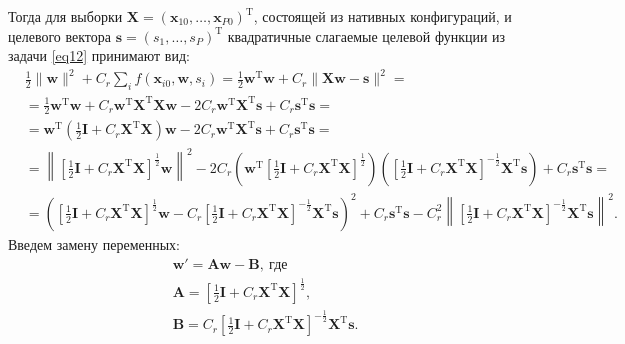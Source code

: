 \documentclass[12pt,twoside]{article}
\begin{document}
Тогда для выборки ${\mathbf{X}}=({\mathbf{x}}_{10}, \dots, {\mathbf{x}}_{P0})^{\text{T}}$, состоящей из нативных конфигураций, и целевого вектора  $\mathbf{s}=(s_1,\dots,s_P)^{\text{T}}$ квадратичные слагаемые целевой функции из задачи \eqref{eq12} принимают вид:
\begin{equation*}
\begin{aligned}
& \frac{1}{2} \|{\mathbf{w}}\|^2 + C_{r}\sum\limits_{i} f({\mathbf{x}}_{i0},{\mathbf{w}}, s_i)=\frac{1}{2}{\mathbf{w}}^{\text{T}}{\mathbf{w}}+C_{r}\|{\mathbf{X}}{\mathbf{w}} - \mathbf{s}\|^2 =\\
& = \frac{1}{2}{\mathbf{w}}^{\text{T}}{\mathbf{w}}+ C_{r}{\mathbf{w}}^{\text{T}}{\mathbf{X}}^{\text{T}}{\mathbf{X}}{\mathbf{w}}- 2C_{r}{\mathbf{w}}^{\text{T}}{\mathbf{X}}^{\text{T}}\mathbf{s} + C_{r}\mathbf{s}^{\text{T}}\mathbf{s}=\\
& = {\mathbf{w}}^{\text{T}}\left(\frac{1}{2}\mathbf{I} + C_{r}{\mathbf{X}}^{\text{T}}{\mathbf{X}}\right){\mathbf{w}}- 2C_{r}{\mathbf{w}}^{\text{T}}{\mathbf{X}}^{\text{T}}\mathbf{s}+ C_{r}\mathbf{s}^{\text{T}}\mathbf{s}=\\
& = \left\|\left[\frac{1}{2}\mathbf{I} + C_{r}{\mathbf{X}}^{\text{T}}{\mathbf{X}}\right]^{\frac{1}{2}}{\mathbf{w}}\right\|^2- 2C_{r}\left({\mathbf{w}}^{\text{T}}\left[\frac{1}{2}\mathbf{I} + C_{r}{\mathbf{X}}^{\text{T}}{\mathbf{X}}\right]^{\frac{1}{2}}\right)
\left(\left[\frac{1}{2}\mathbf{I} + C_{r}{\mathbf{X}}^{\text{T}}{\mathbf{X}}\right]^{-\frac{1}{2}}
{\mathbf{X}}^{\text{T}}\mathbf{s}\right)+ C_{r}\mathbf{s}^{\text{T}}\mathbf{s}=\\
& = \left(\left[\frac{1}{2}\mathbf{I} + C_{r}{\mathbf{X}}^{\text{T}}{\mathbf{X}}\right]^{\frac{1}{2}}{\mathbf{w}} - C_r\left[\frac{1}{2}\mathbf{I} + C_{r}{\mathbf{X}}^{\text{T}}{\mathbf{X}}\right]^{-\frac{1}{2}}
{\mathbf{X}}^{\text{T}}\mathbf{s}\right)^2 + C_r\mathbf{s}^{\text{T}}\mathbf{s}- C_r^2\left\|\left[\frac{1}{2}\mathbf{I} + C_{r}{\mathbf{X}}^{\text{T}}{\mathbf{X}}\right]^{-\frac12}
{\mathbf{X}}^{\text{T}}\mathbf{s}\right\|^2.
\end{aligned}
\end{equation*}
Введем замену переменных:
\begin{equation}\label{eq16}
\begin{aligned}
& \mathbf{w}'= \mathbf{A}{\mathbf{w}} - \mathbf{B}, \ \text{где} \\
& \mathbf{A}=\left[\frac{1}{2}\mathbf{I} + C_{r}{\mathbf{X}}^{\text{T}}{\mathbf{X}}\right]^{\frac{1}{2}},\\
& \mathbf{B}=C_r\left[\frac{1}{2}\mathbf{I} + C_{r}{\mathbf{X}}^{\text{T}}{\mathbf{X}}\right]^{-\frac{1}{2}}
{\mathbf{X}}^{\text{T}}\mathbf{s}.
\end{aligned}
\end{equation}
\end{document}
